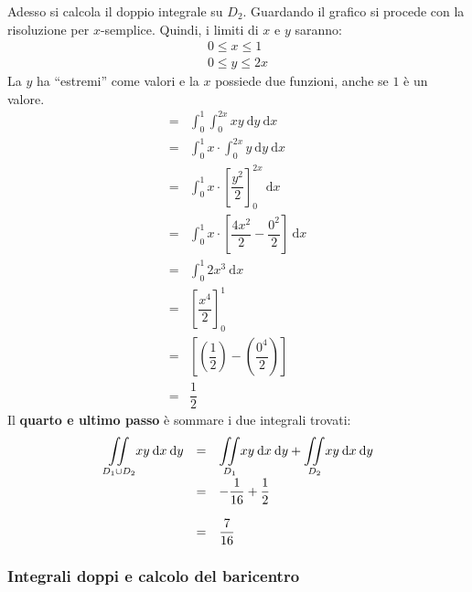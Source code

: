 \documentclass[a4paper]{article}
\newcommand{\dquotes}[1]{``#1''}
\begin{document}
	\noindent
	Adesso si calcola il doppio integrale su $D_{2}$. Guardando il grafico si procede con la risoluzione per $x$-semplice. Quindi, i limiti di $x$ e $y$ saranno:
	\begin{gather*}
		0 \le x \le 1 \\
		0 \le y \le 2x
	\end{gather*}
	La $y$ ha \dquotes{estremi} come valori e la $x$ possiede due funzioni, anche se $1$ è un valore.
	\begin{equation*}
		\begin{array}{ll}
			=& \displaystyle\int_{0}^{1} \int_{0}^{2x} xy \: \mathrm{d}y \: \mathrm{d}x \\ [1.5em]
			=& \displaystyle\int_{0}^{1} x \cdot \int_{0}^{2x} y \: \mathrm{d}y \: \mathrm{d}x \\ [1.5em]
			=& \displaystyle\int_{0}^{1} x \cdot \left[\dfrac{y^{2}}{2}\right]_{0}^{2x} \: \mathrm{d}x \\ [1.5em]
			=& \displaystyle\int_{0}^{1} x \cdot \left[\dfrac{4x^{2}}{2} - \dfrac{0^{2}}{2}\right] \: \mathrm{d}x \\ [1.5em]
			=& \displaystyle\int_{0}^{1} 2x^{3} \: \mathrm{d}x \\ [1.5em]
			=& \left[\dfrac{x^{4}}{2}\right]_{0}^{1} \\ [1.5em]
			=& \left[\left(\dfrac{1}{2}\right) - \left(\dfrac{0^{4}}{2}\right)\right] \\ [1.5em]
			=& \dfrac{1}{2}
		\end{array}
	\end{equation*}
	Il \textbf{quarto e ultimo passo} è sommare i due integrali trovati:
	\begin{equation*}
		\begin{array}{rcl}
			\displaystyle\underset{D_{1} \cup D_{2}}{\int\hspace{-.5em}\int} xy \: \mathrm{d}x \: \mathrm{d}y &=& \underset{D_{1}}{\displaystyle\int\hspace{-.5em}\int} xy \: \mathrm{d}x \: \mathrm{d}y + \underset{D_{2}}{\displaystyle\int\hspace{-.5em}\int} xy \: \mathrm{d}x \: \mathrm{d}y \\ [1.5em]
			&=& -\dfrac{1}{16} + \dfrac{1}{2} \\ [1.5em]
			&=& \dfrac{7}{16}
		\end{array}
	\end{equation*}
	
	\newpage
	\subsubsection{Integrali doppi e calcolo del baricentro}
\end{document}
